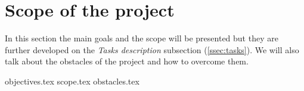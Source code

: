 \section{Scope of the project}
In this section the main goals and the scope will be presented but they are further developed on the \textit{Tasks description} subsection (\ref{ssec:tasks}). We will also talk about the obstacles of the project and how to overcome them.

{objectives.tex}
{scope.tex}
{obstacles.tex}


